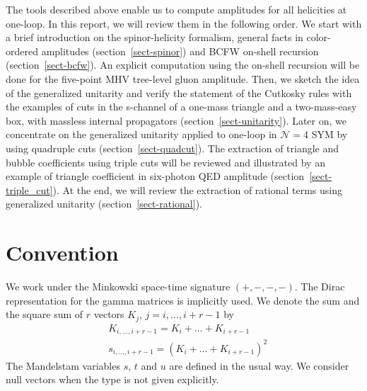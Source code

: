 The tools described above enable us to compute amplitudes for all helicities at one-loop.
In this report, we will review them in the following order.
We start with a brief introduction on the spinor-helicity formalism, general facts in color-ordered amplitudes (section~\ref{sect-spinor}) and BCFW on-shell recursion (section~\ref{sect-bcfw}).
An explicit computation using the on-shell recursion will be done for the five-point MHV tree-level gluon amplitude. 
Then, we sketch the idea of the generalized unitarity and verify the statement of the Cutkosky rules with the examples of cuts in the s-channel of a one-mass triangle and a two-mass-easy box, with massless internal propagators (section~\ref{sect-unitarity}).
Later on, we concentrate on the generalized unitarity applied to one-loop in $\mathcal{N}=4$ SYM by using quadruple cuts (section~\ref{sect-quadcut}).
The extraction of triangle and bubble coefficients using triple cuts will be reviewed and illustrated by an example of triangle coefficient in six-photon QED amplitude (section~\ref{sect-triple_cut}).
At the end, we will review the extraction of rational terms using generalized unitarity (section~\ref{sect-rational}).
%
\section*{Convention}
We work under the Minkowski space-time signature $(+,-,-,-)$.
The Dirac representation for the gamma matrices is implicitly used.
We denote the sum and the square sum of $r$ vectors $K_j$, $j=i,\ldots, i+r-1$ by
\begin{equation*}
\begin{split}
& K_{i,\ldots,i+r-1} = K_i +\ldots + K_{i+r-1}
\\
& s_{i,\ldots , i+r-1} = (K_i+\ldots + K_{i+r-1})^2
\end{split}
\end{equation*}
The Mandelstam variables $s$, $t$ and $u$ are defined in the usual way.
We consider null vectors when the type is not given explicitly.









